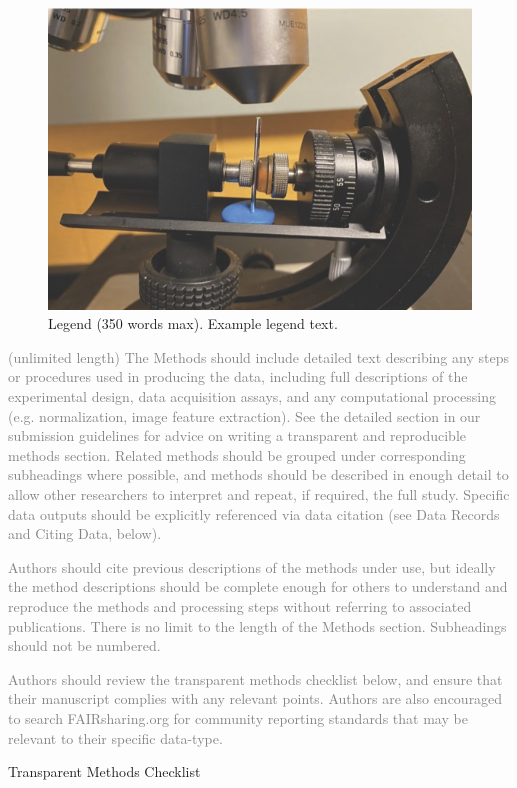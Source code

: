 \documentclass[fleqn,10pt]{wlscirep}
\begin{document}
\begin{figure}[ht]
\centering
\includegraphics[width=0.5\linewidth]{wire-microscope.jpg}
\caption{Legend (350 words max). Example legend text.}
\label{fig: wire-microscope}
\end{figure}

\textcolor{gray}{(unlimited length) The Methods should include detailed text describing any steps or procedures used in producing the data, including full descriptions of the experimental design, data acquisition assays, and any computational processing (e.g. normalization, image feature extraction). See the detailed section in our submission guidelines for advice on writing a transparent and reproducible methods section. Related methods should be grouped under corresponding subheadings where possible, and methods should be described in enough detail to allow other researchers to interpret and repeat, if required, the full study. Specific data outputs should be explicitly referenced via data citation (see Data Records and Citing Data, below).}

\textcolor{gray}{Authors should cite previous descriptions of the methods under use, but ideally the method descriptions should be complete enough for others to understand and reproduce the methods and processing steps without referring to associated publications. There is no limit to the length of the Methods section. Subheadings should not be numbered.}

\textcolor{gray}{Authors should review the transparent methods checklist below, and ensure that their manuscript complies with any relevant points. Authors are also encouraged to search FAIRsharing.org for community reporting standards that may be relevant to their specific data-type.}

Transparent Methods Checklist
\end{document}
